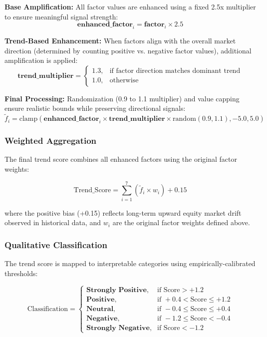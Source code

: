\documentclass[3p,times,procedia]{elsarticle}
\begin{document}
\textbf{Base Amplification:}
All factor values are enhanced using a fixed 2.5x multiplier to ensure meaningful signal strength:
\begin{equation}
\textbf{enhanced\_factor}_i = \textbf{factor}_i \times 2.5
\end{equation}

\textbf{Trend-Based Enhancement:}
When factors align with the overall market direction (determined by counting positive vs. negative factor values), additional amplification is applied:
\begin{equation}
\textbf{trend\_multiplier} = 
\begin{cases} 
1.3, & \text{if factor direction matches dominant trend} \\
1.0, & \text{otherwise}
\end{cases}
\end{equation}

\textbf{Final Processing:}
Randomization (0.9 to 1.1 multiplier) and value capping ensure realistic bounds while preserving directional signals:
\begin{equation}
\tilde{f}_i = \text{clamp}\left(\textbf{enhanced\_factor}_i \times \textbf{trend\_multiplier} \times \text{random}(0.9, 1.1), -5.0, 5.0\right)
\end{equation}

\subsubsection{{Weighted Aggregation}}
The final trend score combines all enhanced factors using the original factor weights:

\begin{equation}
\text{Trend\_Score} = \sum_{i=1}^{7} \left(\tilde{f}_i \times w_i\right) + 0.15
\end{equation}

where the positive bias (+0.15) reflects long-term upward equity market drift observed in historical data, and $w_i$ are the original factor weights defined above.

\subsubsection{{Qualitative Classification}}
The trend score is mapped to interpretable categories using empirically-calibrated thresholds:

\begin{equation}
\text{Classification} = 
\begin{cases} 
\textbf{Strongly Positive}, & \text{if Score} > +1.2 \\
\textbf{Positive}, & \text{if } +0.4 < \text{Score} \leq +1.2 \\
\textbf{Neutral}, & \text{if } -0.4 \leq \text{Score} \leq +0.4 \\
\textbf{Negative}, & \text{if } -1.2 \leq \text{Score} < -0.4 \\
\textbf{Strongly Negative}, & \text{if Score} < -1.2
\end{cases}
\end{equation}
\end{document}
